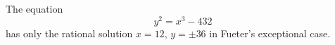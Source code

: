 \begin{proposition}
    The equation
\[
    y^2=x^3-432
\]
    has only the rational solution $x=12$, $y=\pm36$ in Fueter's exceptional case.
\end{proposition}
